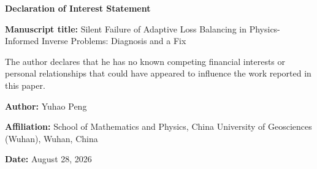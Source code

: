 \documentclass[11pt]{article}
\begin{document}
\begin{center}
{\Large\bfseries Declaration of Interest Statement}
\end{center}

\vspace{1.2cm}

\textbf{Manuscript title:} Silent Failure of Adaptive Loss Balancing in Physics-Informed Inverse Problems: Diagnosis and a Fix

\vspace{0.6cm}

The author declares that he has no known competing financial interests or personal relationships that could have appeared to influence the work reported in this paper.

\vspace{1.2cm}

\textbf{Author:} Yuhao Peng

\vspace{0.3cm}

\textbf{Affiliation:} School of Mathematics and Physics, China University of Geosciences (Wuhan), Wuhan, China

\vspace{0.3cm}

\textbf{Date:} August 28, 2026
\end{document}
